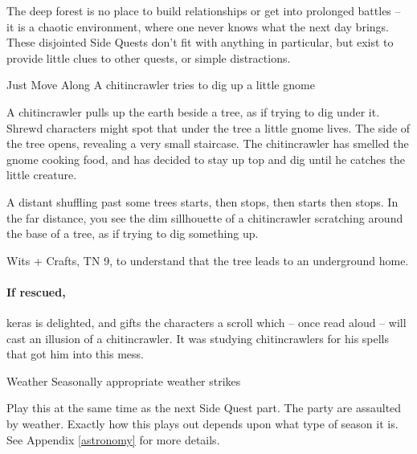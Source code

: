 \begin{multicols}{2}
\stopcontents[sq]

\label{interruptions}

\startcontents[sq]

\sqminitoc

\noindent
The deep forest is no place to build relationships or get into prolonged battles -- it is a chaotic environment, where one never knows what the next day brings.
These disjointed Side Quests don't fit with anything in particular, but exist to provide little clues to other quests, or simple distractions.

{Just Move Along}%
{A chitincrawler tries to dig up a little gnome}%

A chitincrawler pulls up the earth beside a tree, as if trying to dig under it.
Shrewd characters might spot that under the tree a little gnome lives.
The side of the tree opens, revealing a very small staircase.
The chitincrawler has smelled the gnome cooking food, and has decided to stay up top and dig until he catches the little creature.

\begin{boxtext}

  A distant shuffling past some trees starts, then stops, then starts then stops.
  In the far distance, you see the dim sillhouette of a chitincrawler scratching around the base of a tree, as if trying to dig something up.

\end{boxtext}

Wits + Crafts, TN 9, to understand that the tree leads to an underground home.

\chitincrawler

\keras

\paragraph{If rescued,}
\gls{keras} is delighted, and gifts the characters a scroll which -- once read aloud -- will cast an illusion of a chitincrawler.  It was studying chitincrawlers for his spells that got him into this mess.

{Weather}%
{Seasonally appropriate weather strikes}%

Play this at the same time as the next Side Quest part.
The party are assaulted by weather.
Exactly how this plays out depends upon what type of season it is.
See Appendix \ref{astronomy} for more details.


\end{multicols}
